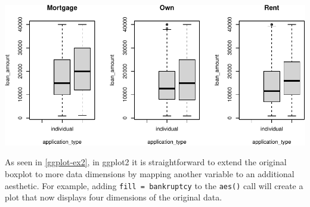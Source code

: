 \documentclass[12pt]{article}
\newenvironment{Shaded}{\begin{snugshade}}{\end{snugshade}}
\newcommand{\AttributeTok}[1]{\textcolor[rgb]{0.77,0.63,0.00}{#1}}
\newcommand{\ControlFlowTok}[1]{\textcolor[rgb]{0.13,0.29,0.53}{\textbf{#1}}}
\newcommand{\DecValTok}[1]{\textcolor[rgb]{0.00,0.00,0.81}{#1}}
\newcommand{\FunctionTok}[1]{\textcolor[rgb]{0.00,0.00,0.00}{#1}}
\newcommand{\NormalTok}[1]{#1}
\newcommand{\OtherTok}[1]{\textcolor[rgb]{0.56,0.35,0.01}{#1}}
\newcommand{\SpecialCharTok}[1]{\textcolor[rgb]{0.00,0.00,0.00}{#1}}
\begin{document}
\linespread{1}

\begin{Shaded}
\end{Shaded}

\begin{center}\includegraphics[width=0.8\linewidth]{educators-perspective-tidyverse_files/figure-latex/base_plot_ex-1} \end{center}

\label{base-plot-ex} \linespread{2}
\vspace{3mm}\setlength{\parindent}{15pt}

As seen in \ref{ggplot-ex2}, in ggplot2 it is straightforward to extend
the original boxplot to more data dimensions by mapping another variable
to an additional aesthetic. For example, adding
\texttt{fill\ =\ bankruptcy} to the \texttt{aes()} call will create a
plot that now displays four dimensions of the original data.

\linespread{1}
\end{document}
